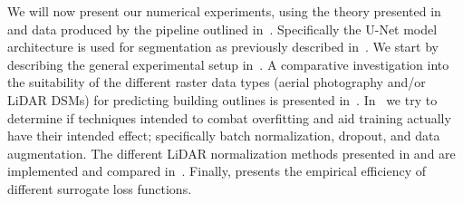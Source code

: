 We will now present our numerical experiments, using the theory presented in~ and data produced by the pipeline outlined in~.
Specifically the U-Net model architecture is used for segmentation as previously described in~.
We start by describing the general experimental setup in~.
A comparative investigation into the suitability of the different raster data types (aerial photography and/or LiDAR DSMs) for predicting building outlines is presented in~.
In~ we try to determine if techniques intended to combat overfitting and aid training actually have their intended effect; specifically batch normalization, dropout, and data augmentation.
The different LiDAR normalization methods presented in  and  are implemented and compared in~.
Finally,  presents the empirical efficiency of different surrogate loss functions.
